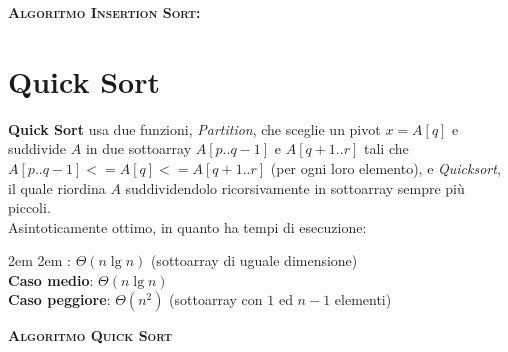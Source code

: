 \documentclass{article}
\begin{document}
\vspace{0.15in}

\noindent\textbf{\textsc{Algoritmo Insertion Sort:}}\\
\vspace{0.0002in}


\section{Quick Sort}
{\bf Quick Sort} usa due funzioni, {\em Partition}, che sceglie un pivot $x=A[q]$ e suddivide $A$ in due sottoarray $A[p..q-1]$ e $A[q+1..r]$ tali che $A[p..q-1]<=A[q]<=A[q+1..r]$ (per ogni loro elemento), e {\em Quicksort}, il quale riordina $A$ suddividendolo ricorsivamente in sottoarray sempre più piccoli.\\

Asintoticamente ottimo, in quanto ha tempi di esecuzione:

\begingroup
\leftskip2em \rightskip2em
:  $\Theta(n\lg n)$ (sottoarray di uguale dimensione)\\
{\bf Caso medio}: $\Theta(n\lg n)$\\
{\bf Caso peggiore}: $\Theta(n^2)$ (sottoarray con $1$ ed $n-1$ elementi)
\par
\endgroup

\vspace{0.15in}

\noindent\textbf{\textsc{Algoritmo Quick Sort}}\\
\vspace{0.0002in}
\end{document}
